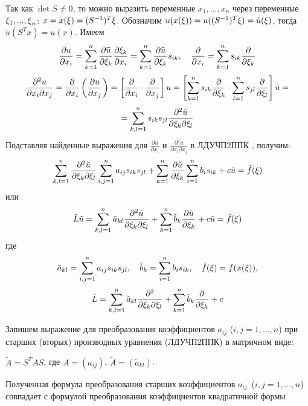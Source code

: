 Так как $\det S\ne 0$, то можно выразить переменные $x_{1} ,...,x_{n} $ через переменные ${\rm \xi }_{1} {\rm ,...,\xi }_{n} $: $x=x({\rm \xi })=(S^{-1} )^{T} {\rm \xi }$. Обозначим $u(x({\rm \xi }))=u((S^{-1} )^{T} {\rm \xi })=\tilde{u}({\rm \xi })$, тогда $\tilde{u}(S^{T} x)=u(x)$. Имеем
\[\frac{\partial u}{\partial x_{i} } =\sum _{k=1}^{n}\frac{\partial \tilde{u}}{\partial {\rm \xi }_{k} } \frac{\partial {\rm \xi }_{k} }{\partial x_{i} }  =\sum _{k=1}^{n}\frac{\partial \tilde{u}}{\partial {\rm \xi }_{k} } s_{ik},\quad   \frac{\partial }{\partial x_{i} } =\sum _{k=1}^{n}s_{ik} \frac{\partial }{\partial {\rm \xi }_{k} }  \]
\[\frac{\partial ^{2} u}{\partial x_{i} \partial x_{j} } =\frac{\partial }{\partial x_{i} } \left(\frac{\partial u}{\partial x_{j} } \right)=\left[\frac{\partial }{\partial x_{i} } \cdot \frac{\partial }{\partial x_{j} } \right]u=\left[\sum _{k=1}^{n}s_{ik} \frac{\partial }{\partial {\rm \xi }_{k} }  \cdot \sum _{l=1}^{n}s_{jl} \frac{\partial }{\partial {\rm \xi }_{l} }  \right]\tilde{u}=\]
\[=\sum _{k,l=1}^{n}s_{ik} s_{jl} \frac{\partial ^{2} \tilde{u}}{\partial {\rm \xi }_{k} \partial {\rm \xi }_{l} }  \]
Подставляя найденные выражения для $\frac{\partial u}{\partial x_{i} } $ и $\frac{\partial ^{2} u}{\partial x_{i} \partial x_{j} } $ в  ЛДУЧП2ППК , получим:
\[\sum _{k,l=1}^{n}\frac{\partial ^{2} \tilde{u}}{\partial {\rm \xi }_{k} \partial {\rm \xi }_{l} } \sum _{i,j=1}^{n}a_{ij} s_{ik} s_{jl}   +\sum _{k=1}^{n}\frac{\partial \tilde{u}}{\partial {\rm \xi }_{k} }  \sum _{i=1}^{n}b_{i} s_{ik}  +c\tilde{u}=\tilde{f}({\rm \xi })\]
или
\[\tilde{L}\tilde{u}=\sum _{k,l=1}^{n}\tilde{a}_{kl} \frac{\partial ^{2} \tilde{u}}{\partial {\rm \xi }_{k} \partial {\rm \xi }_{l} }  +\sum _{k=1}^{n}\tilde{b}_{k} \frac{\partial \tilde{u}}{\partial {\rm \xi }_{k} }  +c\tilde{u}=\tilde{f}({\rm \xi })\]
где
\[\tilde{a}_{kl} =\sum _{i,j=1}^{n}a_{ij} s_{ik} s_{jl},\quad \tilde{b}_{k} =\sum _{i=1}^{n}b_{i} s_{ik},\quad   \tilde{f}({\rm \xi })=f(x({\rm \xi })),\]
\[\tilde{L}=\sum _{k,l=1}^{n}\tilde{a}_{kl} \frac{\partial ^{2} }{\partial {\rm \xi }_{k} \partial {\rm \xi }_{l} }  +\sum _{k=1}^{n}\tilde{b}_{k} \frac{\partial }{\partial {\rm \xi }_{k} }  +c\]

\noindent Запишем выражение для преобразования коэффициентов $a_{ij} $ ($i,j=1,...,n$) при старших (вторых) производных уравнения (ЛДУЧП2ППК) в матричном виде:

\noindent $\tilde{A}=S^{T} AS$, где $A=(a_{ij} )$, $\tilde{A}=(\tilde{a}_{kl} )$.

Полученная формула преобразования старших коэффициентов $a_{ij} $~($i,j=1,...,n$) совпадает с формулой преобразования коэффициентов квадратичной формы

